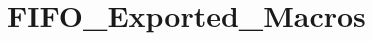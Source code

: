 \hypertarget{group___f_i_f_o___exported___macros}{}\section{F\+I\+F\+O\+\_\+\+Exported\+\_\+\+Macros}
\label{group___f_i_f_o___exported___macros}
